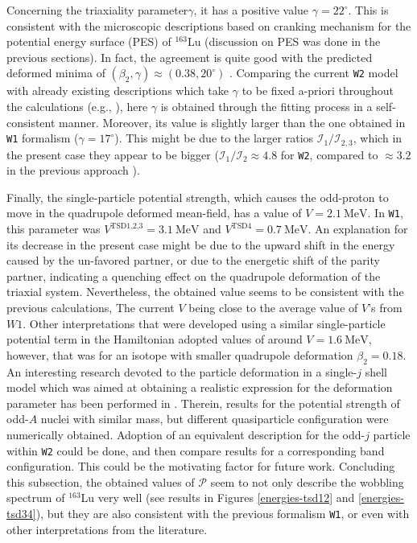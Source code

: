 \documentclass[11pt]{article}
\begin{document}
Concerning the triaxiality parameter$\gamma$, it has a positive value $\gamma=22^\circ$. This is consistent with the microscopic descriptions based on cranking mechanism for the potential energy surface (PES) of $^{163}$Lu (discussion on PES was done in the previous sections). In fact, the agreement is quite good with the predicted deformed minima of $(\beta_2,\gamma)\approx(0.38,20^\circ)$ \cite{jensen2002wobbling,jensen2004coexisting}. Comparing the current \texttt{W2} model with already existing descriptions which take $\gamma$ to be fixed a-priori throughout the calculations (e.g., \cite{tanabe2006algebraic,tanabe2017stability}), here $\gamma$ is obtained through the fitting process in a self-consistent manner. Moreover, its value is slightly larger than the one obtained in \texttt{W1} formalism ($\gamma=17^\circ$). This might be due to the larger ratios $\mathcal{I}_1/\mathcal{I}_{2,3}$, which in the present case they appear to be bigger ($\mathcal{I}_1/\mathcal{I}_{2}\approx4.8$ for \texttt{W2}, compared to $\approx3.2$ in the previous approach ).

Finally, the single-particle potential strength, which causes the odd-proton to move in the quadrupole deformed mean-field, has a value of $V=2.1\ \text{MeV}$. In \texttt{W1}, this parameter was $V^{\text{TSD1,2,3}}=3.1\ \text{MeV}$ and $V^\text{TSD4}=0.7\ \text{MeV}$. An explanation for its decrease in the present case might be due to the upward shift in the energy caused by the un-favored partner, or due to the energetic shift of the parity partner, indicating a quenching effect on the quadrupole deformation of the triaxial system. Nevertheless, the obtained value seems to be consistent with the previous calculations, The current $V$ being close to the average value of $V$'s from $W1$. Other interpretations \cite{tanabe2017stability} that were developed using a similar single-particle potential term in the Hamiltonian adopted values of around $V=1.6\ \text{MeV}$, however, that was for an isotope with smaller quadrupole deformation $\beta_2=0.18$. An interesting research devoted to the particle deformation in a single-$j$ shell model which was aimed at obtaining a realistic expression for the deformation parameter has been performed in \cite{shou2009coupling}. Therein, results for the potential strength of odd-$A$ nuclei with similar mass, but different quasiparticle configuration were numerically obtained. Adoption of an equivalent description for the odd-$j$ particle within \texttt{W2} could be done, and then compare results for a corresponding band configuration. This could be the motivating factor for future work. Concluding this subsection, the obtained values of $\mathcal{P}$ seem to not only describe the wobbling spectrum of $^{163}$Lu very well (see results in Figures \ref{energies-tsd12} and \ref{energies-tsd34}), but they are also consistent with the previous formalism \texttt{W1}, or even with other interpretations from the literature. 
\end{document}
